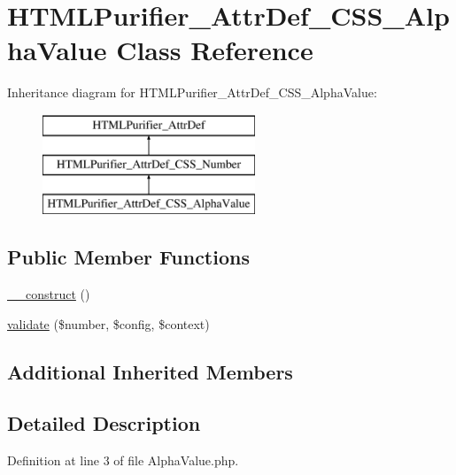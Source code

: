 \hypertarget{classHTMLPurifier__AttrDef__CSS__AlphaValue}{\section{H\+T\+M\+L\+Purifier\+\_\+\+Attr\+Def\+\_\+\+C\+S\+S\+\_\+\+Alpha\+Value Class Reference}
\label{classHTMLPurifier__AttrDef__CSS__AlphaValue}
}
Inheritance diagram for H\+T\+M\+L\+Purifier\+\_\+\+Attr\+Def\+\_\+\+C\+S\+S\+\_\+\+Alpha\+Value\+:\begin{figure}[H]
\begin{center}
\leavevmode
\includegraphics[height=3.000000cm]{classHTMLPurifier__AttrDef__CSS__AlphaValue}
\end{center}
\end{figure}
\subsection*{Public Member Functions}
\begin{DoxyCompactItemize}
\item 
\hyperlink{classHTMLPurifier__AttrDef__CSS__AlphaValue_ab57414f57d2c77dbd11c99a00f274215}{\+\_\+\+\_\+construct} ()
\item 
\hyperlink{classHTMLPurifier__AttrDef__CSS__AlphaValue_a9b6e090e417ca736003632276b99ff81}{validate} (\$number, \$config, \$context)
\end{DoxyCompactItemize}
\subsection*{Additional Inherited Members}


\subsection{Detailed Description}


Definition at line 3 of file Alpha\+Value.\+php.



